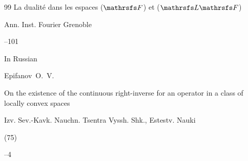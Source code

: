 \begin{thebibliography}{99}
\paper La dualit\'e dans les espaces ($\mathrsfs F$) et ($\mathrsfs L \mathrsfs F$)



\jour  Ann. Inst. Fourier Grenoble 


--101 







\lang In Russian

\by Epifanov~O.~V.

\paper On the existence of the continuous right-inverse for an operator in a class of locally convex spaces

\jour Izv. Sev.-Kavk. Nauchn. Tsentra Vyssh. Shk., Estestv. Nauki 


(75)

--4 






\end{thebibliography}



\EngDate



\Russian

\newpage



%

%

